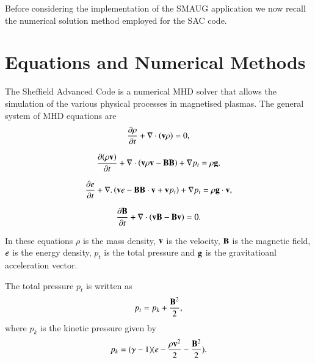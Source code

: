 \documentclass[final,1p]{elsarticle}
\begin{document}



 
Before considering the implementation of the SMAUG application we now recall the numerical solution method employed for the SAC code. 

\section{Equations and Numerical Methods}
The Sheffield Advanced Code \cite{Shelyag2008} is a numerical MHD solver that allows the simulation of the various physical processes in magnetised plasmas. The general system of MHD equations are
\begin{equation}\label{eqdens}
{{\partial \rho}\over{\partial t}}+\nabla\cdot\left( {\bf v}\rho\right)=0,
\end{equation}

\begin{equation}\label{eqmom}
{{\partial ( \rho {\bf v})}\over{\partial t}}+\nabla\cdot\left( {\bf v}\rho {\bf v}-{\bf B B}\right)+\nabla p_t=\rho{\bf g},
\end{equation}

\begin{equation}\label{eqe}
{{\partial e}\over{\partial t}}+\nabla.\left({\bf v}e-{\bf B B}\cdot{\bf v}+{\bf v}p_{t}\right)+\nabla p_t=\rho{\bf g}\cdot{\bf v},
\end{equation}

\begin{equation}\label{eqb}
{{\partial{\bf B}}\over{\partial t}} +\nabla \cdot\left(  {\bf vB}-{\bf Bv}\right)=0.
\end{equation}

In these equations $\rho$ is the mass density, $  \bf { v} $ is the velocity,   $ \bf B$ is the magnetic field, $\it{e}$ is the energy density, $p_{t}$ is the total pressure and $\bf g$ is the gravitatioanl acceleration vector.

The total pressure $p_{t}$ is written as
\begin{equation}\label{eqpt}
p_{t}=p_{k}+{{\bf B}^{2}\over{2}},
\end{equation}
where $p_k$ is the kinetic pressure given by
\begin{equation}\label{eqpk}
p_{k}=(\gamma - 1)( e-{{\rho \bf v }^{2}\over{2}}-  {{\bf B}^{2}\over{2}} ).
\end{equation}
\end{document}
